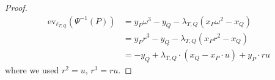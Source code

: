 \documentclass{article}
\newcommand{\ev}{\mathrm{ev}}
\theoremstyle{remark}
\theoremstyle{plain}
\begin{document}
\begin{proof}
    \[
        \begin{aligned}
            \ev_{\ell_{T,Q}}(\Psi^{-1}(P)) & = y_P \omega^3 - y_Q - \lambda_{T,Q} (x_P \omega^2 - x_Q)\\
            & = y_P r^3 - y_Q - \lambda_{T,Q} (x_P r^2 - x_Q)\\
            & = -y_Q + \lambda_{T,Q} \cdot (x_Q - x_P \cdot u) + y_P \cdot ru
        \end{aligned}
    \]
    where we used $r^2 = u$, $r^3 = ru$.
\end{proof}

{}

\end{document}
